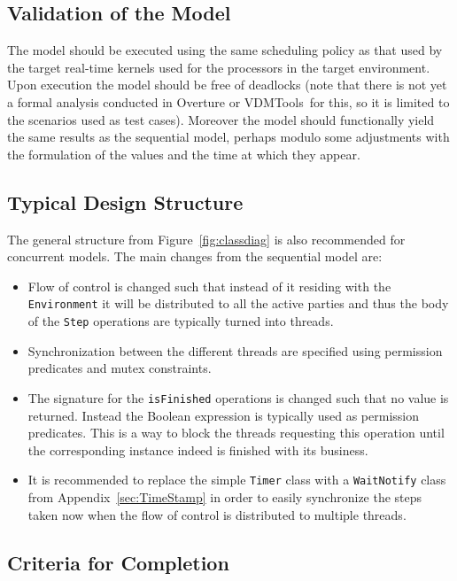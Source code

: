 \documentclass{overturerepchap}
\newcommand{\VDMTools}{VDMTools}
\begin{document}
\subsection{Validation of the Model}

The model should be executed using the same scheduling policy as that
used by the target real-time kernels used for the processors in the
target environment. Upon execution the model should be free of
deadlocks (note that there is not yet a formal analysis conducted in 
Overture or \VDMTools\ for this, so it is limited to the scenarios used as test
cases). Moreover the model should functionally yield the same
results as the sequential model, perhaps modulo some adjustments with
the formulation of the values and the time at which they appear.

\subsection{Typical Design Structure}\label{sec:designconcur}

The general structure from Figure~\ref{fig:classdiag} is also recommended 
for concurrent models. The main changes from the sequential model are:

\begin{itemize}
\item Flow of control is changed such that instead of it residing with the
      \texttt{Environment} it will be distributed to all the active parties
      and thus the body of the \texttt{Step} operations are typically 
      turned into threads. 
\item Synchronization between the different threads are specified using
      permission predicates and mutex constraints.
\item The signature for the \texttt{isFinished} operations is changed 
      such that no value is returned. Instead the Boolean expression is 
      typically used as permission predicates. This is a way to block
      the threads requesting this operation until the corresponding 
      instance indeed is finished with its business.
\item It is recommended to replace the simple \texttt{Timer} class with
      a \texttt{WaitNotify} class from Appendix~\ref{sec:TimeStamp} in order
      to easily synchronize the steps taken now when the flow of control
      is distributed to multiple threads.
\end{itemize}

\subsection{Criteria for Completion}
\end{document}
